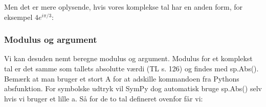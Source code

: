 \documentclass[letterpaper,10pt,english]{jupyterBook}
\begin{document}
\begin{sphinxVerbatim}[commandchars=\\\{\}]
      
\end{sphinxVerbatim}

\noindent{}

\noindent{}

\noindent{}

Men det er mere oplysende, hvis vores komplekse tal har en anden form, for eksempel \(4 e^{i \pi / 3}\):

\begin{sphinxVerbatim}[commandchars=\\\{\}]
        
\end{sphinxVerbatim}

\noindent{}

\noindent{}

\noindent{}


\subsubsection{Modulus og argument}
\label{\detokenize{notebooks/sympy/Notebook_kompleks:modulus-og-argument}}
Vi kan desuden nemt beregne modulus og argument. Modulus for et komplekst tal er det samme som tallets absolutte værdi (TL s. 126) og findes med sp.Abs(). Bemærk at man bruger et stort A for at adskille kommandoen fra Pythons abs\sphinxhyphen{}funktion. For symbolske udtryk vil SymPy dog automatisk bruge sp.Abs() selv hvis vi bruger et lille a. Så for de to tal defineret ovenfor får vi:
\end{document}
